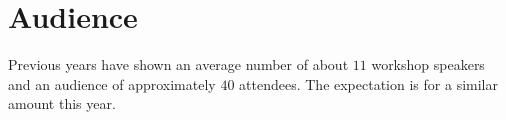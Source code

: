 \documentclass[10pt]{article}
\begin{document}
\section*{Audience}
Previous years have shown an average number of about $11$ workshop
speakers and an audience of approximately $40$ attendees. The
expectation is for a similar amount this year.
\end{document}
